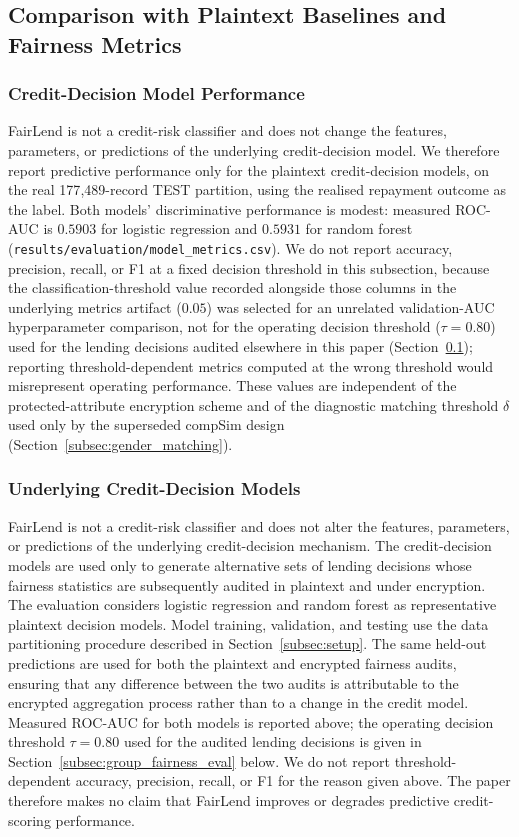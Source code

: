 \documentclass[a4paper,fleqn]{cas-dc}
\begin{document}
\subsection{Comparison with Plaintext Baselines and Fairness Metrics}
\label{subsec:baselines_fairness}

\subsubsection{Credit-Decision Model Performance} FairLend is not a credit-risk classifier and does not change the features, parameters, or predictions of the underlying credit-decision model. We therefore report predictive performance only for the plaintext credit-decision models, on the real 177{,}489-record TEST partition, using the realised repayment outcome as the label. Both models' discriminative performance is modest: measured ROC-AUC is $0.5903$ for logistic regression and $0.5931$ for random forest (\texttt{results/evaluation/model\_metrics.csv}). We do not report accuracy, precision, recall, or F1 at a fixed decision threshold in this subsection, because the classification-threshold value recorded alongside those columns in the underlying metrics artifact ($0.05$) was selected for an unrelated validation-AUC hyperparameter comparison, not for the operating decision threshold ($\tau=0.80$) used for the lending decisions audited elsewhere in this paper (Section~\ref{subsec:baselines_fairness}); reporting threshold-dependent metrics computed at the wrong threshold would misrepresent operating performance. These values are independent of the protected-attribute encryption scheme and of the diagnostic matching threshold $\delta$ used only by the superseded compSim design (Section~\ref{subsec:gender_matching}).


\subsubsection{Underlying Credit-Decision Models} FairLend is not a credit-risk classifier and does not alter the features, parameters, or predictions of the underlying credit-decision mechanism. The credit-decision models are used only to generate alternative sets of lending decisions whose fairness statistics are subsequently audited in plaintext and under encryption. The evaluation considers logistic regression and random forest as representative plaintext decision models. Model training, validation, and testing use the data partitioning procedure described in Section~\ref{subsec:setup}. The same held-out predictions are used for both the plaintext and encrypted fairness audits, ensuring that any difference between the two audits is attributable to the encrypted aggregation process rather than to a change in the credit model. Measured ROC-AUC for both models is reported above; the operating decision threshold $\tau=0.80$ used for the audited lending decisions is given in Section~\ref{subsec:group_fairness_eval} below. We do not report threshold-dependent accuracy, precision, recall, or F1 for the reason given above. The paper therefore makes no claim that FairLend improves or degrades predictive credit-scoring performance.
\end{document}
